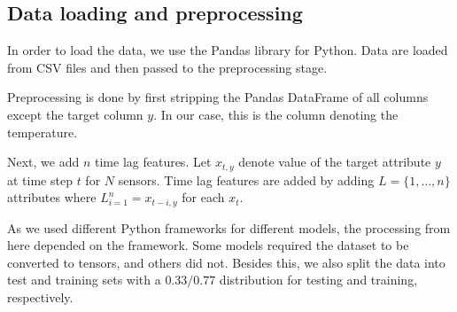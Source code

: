 \subsection{Data loading and preprocessing}\label{sec:data loading and preprocessing}
In order to load the data, we use the Pandas library for Python.
Data are loaded from CSV files and then passed to the preprocessing stage.

Preprocessing is done by first stripping the Pandas DataFrame of all columns except the target column $y$. In our case, this is the column denoting the temperature.

Next, we add $n$ time lag features. Let $x_{t,y}$ denote value of the target attribute $y$ at time step $t$ for $N$ sensors. 
Time lag features are added by adding $L=\{1,\dots, n\}$ attributes where $L_{i=1}^n=x_{t-i, y}$ for each $x_{t}$.

As we used different Python frameworks for different models, the processing from here depended on the framework. Some models required the dataset to be converted to tensors, and others did not.
Besides this, we also split the data into test and training sets with a $0.33/0.77$ distribution for testing and training, respectively.
